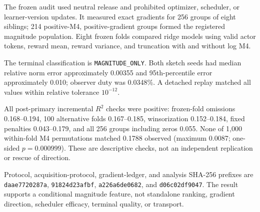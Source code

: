 \documentclass{article}
\begin{document}
The frozen audit used neutral release and prohibited optimizer, scheduler, or
learner-version updates. It measured exact gradients for 256 groups of eight
siblings; 214 positive-M4, positive-gradient groups formed the registered
magnitude population. Eight frozen folds compared ridge models using valid
actor tokens, reward mean, reward variance, and truncation with and without log
M4.

\begin{table}[h]
\caption{Exact-gradient construct audit.}
\centering
{}
\end{table}

The terminal classification is \texttt{MAGNITUDE\_ONLY}. Both sketch seeds had
median relative norm error approximately 0.00355 and 95th-percentile error
approximately 0.010; observer duty was 0.0348\%. A detached replay matched all
values within relative tolerance $10^{-12}$.

All post-primary incremental $R^2$ checks were positive: frozen-fold omissions
0.168--0.194, 100 alternative folds 0.167--0.185, winsorization 0.152--0.184,
fixed penalties 0.043--0.179, and all 256 groups including zeros 0.055. None of
1,000 within-fold M4 permutations matched 0.1788 observed (maximum 0.0087;
one-sided $p=0.000999$). These are descriptive checks, not an independent
replication or rescue of direction.

Protocol, acquisition-protocol, gradient-ledger, and analysis SHA-256 prefixes
are \texttt{daae7720287a}, \texttt{91824d23afbf},
\texttt{a226a6de0682}, and \texttt{d06c02df9047}. The result supports a
conditional magnitude feature, not standalone ranking, gradient direction,
scheduler efficacy, terminal quality, or transport.
\end{document}
